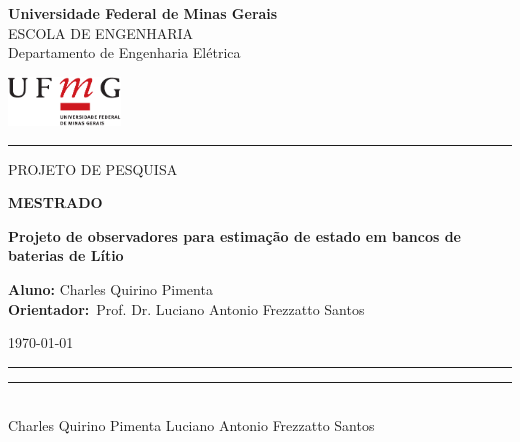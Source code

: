 \thispagestyle{empty}

\noindent
\begin{minipage}{0.8\linewidth}
  {\Large\bf Universidade Federal de Minas Gerais}\\
  {\small ESCOLA DE ENGENHARIA}\\
  {\sc Departamento de Engenharia Elétrica}
\end{minipage} 
\hfill 
\begin{minipage}{3cm}
  \includegraphics[width=3cm]{ufmg_ext.pdf}
\end{minipage}

\vspace{1mm}

\noindent
\hrule

\vspace{2.0cm}

\vfill

\begin{center}
  \Large PROJETO DE PESQUISA
\end{center}

\vfill

\begin{center}
  \Large\textbf{MESTRADO}
\end{center}

\vfill

\begin{center}
  \LARGE \bf Projeto de observadores para estimação de estado em bancos de baterias de Lítio
\end{center}

\vfill

\begin{flushright}
\begin{minipage}{12.0cm}
{\bf Aluno:} Charles Quirino Pimenta \\
{\bf Orientador:}~Prof. Dr. Luciano Antonio Frezzatto Santos \\
\end{minipage}
\end{flushright}

\vfill

\begin{center}
  \today
\end{center}

\vfill

\noindent
\rule{6cm}{0.25mm} \hspace{4cm} \rule{6cm}{0.25mm}\\

\noindent
\hspace{0.50cm} Charles Quirino Pimenta \hspace{5.5cm} Luciano Antonio Frezzatto Santos

\newpage